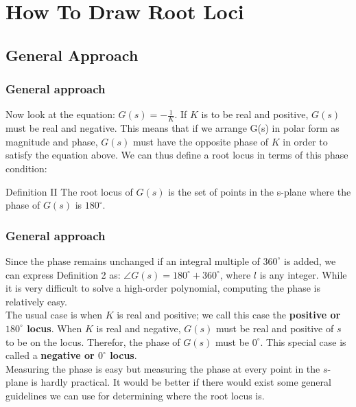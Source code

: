 \section{How To Draw Root Loci}

\subsection{General Approach}

\begin{frame}
\frametitle{General approach}
	Now look at the equation: $G(s) = -\frac{1}{K}$. If $K$ is to be real and positive, $G(s)$ must be real and negative. This means that if we arrange G(s) in polar form as magnitude and phase, $G(s)$ must have the opposite phase of $K$ in order to satisfy the equation above. We can thus define a root locus in terms of this phase condition:  
	\vspace{0.5em}
	\begin{block}{Definition II}
		The root locus of $G(s)$ is the set of points in the s-plane where the phase of $G(s)$ is $180^{\circ}$.	
	\end{block}
\end{frame}

\begin{frame}
\frametitle{General approach}
	Since the phase remains unchanged if an integral multiple of $360^{\circ}$ is added, we can express Definition 2 as: $\angle G(s) = 180^{\circ} + 360^{\circ}$, where $l$ is any integer. While it is very difficult to solve a high-order polynomial, computing the phase is relatively easy.\\
	\vspace{1em}
	The usual case is when $K$ is real and positive; we call this case the \textbf{positive or $180^{\circ}$ locus}. When $K$ is real and negative, $G(s)$ must be real and positive of $s$ to be on the locus. Therefor, the phase of $G(s)$ must be $0^{\circ}$. This special case is called a \textbf{negative or $0^{\circ}$ locus}.\\
	\vspace{1em}
	Measuring the phase is easy but measuring the phase at every point in the $s$-plane is hardly practical. It would be better if there would exist some general guidelines we can use for determining where the root locus is.
\end{frame}


